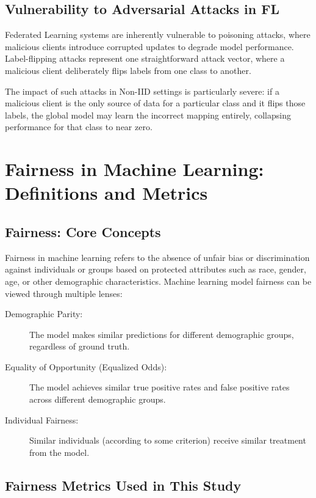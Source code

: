 \documentclass[11pt,a4paper]{report}
\begin{document}
\subsection{Vulnerability to Adversarial Attacks in FL}

Federated Learning systems are inherently vulnerable to poisoning attacks, where malicious clients introduce corrupted updates to degrade model performance. Label-flipping attacks represent one straightforward attack vector, where a malicious client deliberately flips labels from one class to another.

The impact of such attacks in Non-IID settings is particularly severe: if a malicious client is the only source of data for a particular class and it flips those labels, the global model may learn the incorrect mapping entirely, collapsing performance for that class to near zero.

\section{Fairness in Machine Learning: Definitions and Metrics}

\subsection{Fairness: Core Concepts}

Fairness in machine learning refers to the absence of unfair bias or discrimination against individuals or groups based on protected attributes such as race, gender, age, or other demographic characteristics. Machine learning model fairness can be viewed through multiple lenses:

\begin{description}
    \item[Demographic Parity:] The model makes similar predictions for different demographic groups, regardless of ground truth.
    \item[Equality of Opportunity (Equalized Odds):] The model achieves similar true positive rates and false positive rates across different demographic groups.
    \item[Individual Fairness:] Similar individuals (according to some criterion) receive similar treatment from the model.
\end{description}

\subsection{Fairness Metrics Used in This Study}
\end{document}
